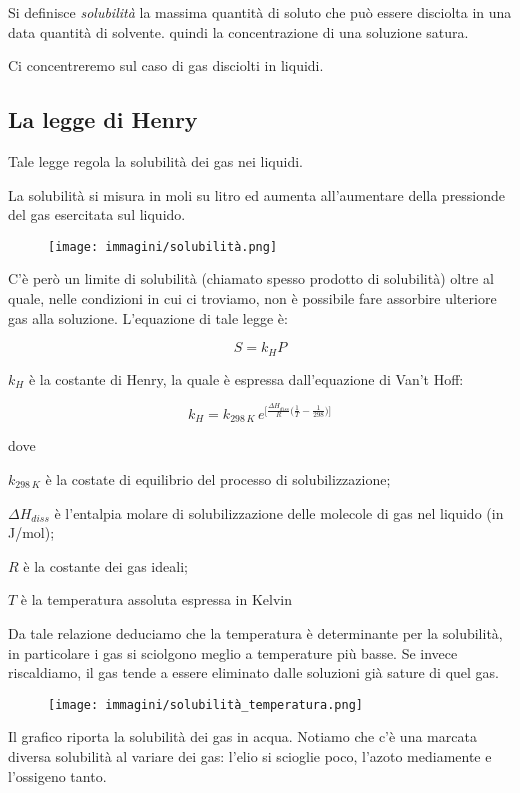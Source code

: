 Si definisce \textit{solubilità} la massima quantità di soluto che può essere disciolta in una data quantità di
solvente. \E quindi la concentrazione di una soluzione satura.

Ci concentreremo sul caso di gas disciolti in liquidi.
\subsection{La legge di Henry}
Tale legge regola la solubilità dei gas nei liquidi.

La solubilità si misura in moli su litro ed aumenta all'aumentare della pressionde del gas esercitata sul liquido.
\begin{figure}[htp]
    \centering
    \texttt{[image: immagini/solubilità.png]}
\end{figure}

C'è però un limite di solubilità (chiamato spesso prodotto di solubilità) oltre al quale, nelle condizioni in cui ci troviamo, non è possibile fare assorbire ulteriore gas alla soluzione.
L'equazione di tale legge è:

$$S=k_HP$$

$k_H$ è la costante di Henry, la quale è espressa dall'equazione di Van't Hoff:

$$k_H=k_{298 \, K} \, e^{\big[\frac{\Delta H_{diss}}{R} \big( \frac{1}{T} - \frac{1}{298} \big) \big]}$$

dove

$k_{298 \, K}$ è la costate di equilibrio del processo di solubilizzazione;

$\Delta H_{diss}$ è l'entalpia molare di solubilizzazione delle molecole di gas nel liquido (in J/mol);

$R$ è la costante dei gas ideali;

$T$ è la temperatura assoluta espressa in Kelvin

Da tale relazione deduciamo che la temperatura è determinante per la solubilità, in particolare i gas si sciolgono meglio a temperature più basse. Se invece riscaldiamo, il gas tende a essere eliminato dalle soluzioni già sature di quel gas.

\begin{minipage}{0.5 \textwidth}
    \begin{figure}[H]
        \centering
        \texttt{[image: immagini/solubilità\_temperatura.png]}
    \end{figure}
\end{minipage}
\begin{minipage}{0.4 \textwidth}
    \vspace{0.8cm}Il grafico riporta la solubilità dei gas in acqua. Notiamo che c'è una marcata diversa solubilità al variare dei gas: l'elio si scioglie poco, l'azoto mediamente e l'ossigeno tanto.
\end{minipage}

